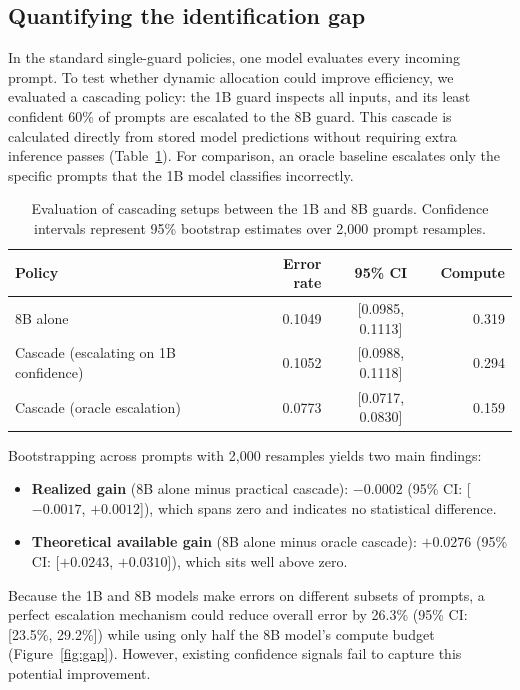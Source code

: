\documentclass[11pt]{article}
\begin{document}
\subsection{Quantifying the identification gap}
\label{sec:gap}

In the standard single-guard policies, one model evaluates every incoming prompt. To test whether dynamic allocation could improve efficiency, we evaluated a cascading policy: the 1B guard inspects all inputs, and its least confident 60\% of prompts are escalated to the 8B guard. This cascade is calculated directly from stored model predictions without requiring extra inference passes (Table~\ref{tab:cascade}). For comparison, an oracle baseline escalates only the specific prompts that the 1B model classifies incorrectly.

\begin{table}[ht]
\centering
\small
\caption{Evaluation of cascading setups between the 1B and 8B guards. Confidence intervals represent 95\% bootstrap estimates over 2,000 prompt resamples.}
\label{tab:cascade}
\begin{tabular}{lrcr}
\toprule
Policy & Error rate & 95\% CI & Compute \\
\midrule
8B alone & 0.1049 & [0.0985, 0.1113] & 0.319 \\
Cascade (escalating on 1B confidence) & 0.1052 & [0.0988, 0.1118] & 0.294 \\
Cascade (oracle escalation) & 0.0773 & [0.0717, 0.0830] & 0.159 \\
\bottomrule
\end{tabular}
\end{table}

Bootstrapping across prompts with 2,000 resamples yields two main findings:
\begin{itemize}
  \item \textbf{Realized gain} (8B alone minus practical cascade): $-0.0002$ (95\% CI: [$-0.0017$, $+0.0012$]), which spans zero and indicates no statistical difference.
  \item \textbf{Theoretical available gain} (8B alone minus oracle cascade): $+0.0276$ (95\% CI: [$+0.0243$, $+0.0310$]), which sits well above zero.
\end{itemize}

Because the 1B and 8B models make errors on different subsets of prompts, a perfect escalation mechanism could reduce overall error by 26.3\% (95\% CI: [23.5\%, 29.2\%]) while using only half the 8B model's compute budget (Figure~\ref{fig:gap}). However, existing confidence signals fail to capture this potential improvement.
\end{document}
